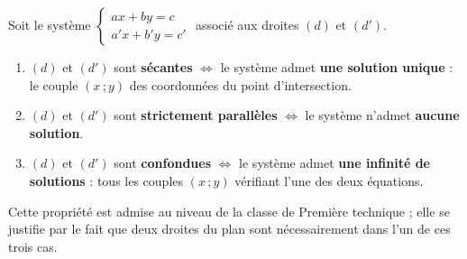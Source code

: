 \documentclass[11pt]{article}
\begin{document}
\begin{propriete}
Soit le système $\begin{cases} ax+by=c \\ a'x+b'y=c' \end{cases}$ associé aux droites $(d)$ et $(d')$.
\begin{enumerate}
\item $(d)$ et $(d')$ sont \textbf{sécantes} $\iff$ le système admet \textbf{une solution unique} : le couple $(x\,;y)$ des coordonnées du point d'intersection.
\item $(d)$ et $(d')$ sont \textbf{strictement parallèles} $\iff$ le système n'admet \textbf{aucune solution}.
\item $(d)$ et $(d')$ sont \textbf{confondues} $\iff$ le système admet \textbf{une infinité de solutions} : tous les couples $(x\,;y)$ vérifiant l'une des deux équations.
\end{enumerate}
Cette propriété est admise au niveau de la classe de Première technique ; elle se justifie par le fait que deux droites du plan sont nécessairement dans l'un de ces trois cas.
\end{propriete}
\end{document}
